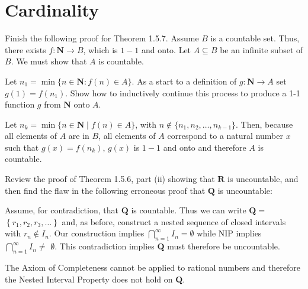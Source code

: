\section{Cardinality}

\begin{exercise}
  Finish the following proof for Theorem 1.5.7.
  Assume $B$ is a countable set. Thus, there exists $f: \mathbf{N} \rightarrow B$, which is $1-1$ and onto. Let $A \subseteq B$ be an infinite subset of $B$. We must show that $A$ is countable.

  Let $n_{1}=\min \{n \in \mathbf{N}: f(n) \in A\}$.
  As a start to a definition of $g: \mathbf{N} \rightarrow A$ set $g(1)=f\left(n_{1}\right)$.
  Show how to inductively continue this process to produce a 1-1 function $g$ from $\mathbf{N}$ onto $A$.
\end{exercise}

\begin{solution}
  \BAD
  Let $n_k=\min\{n\in\mathbf{N}\mid f(n)\in A\}$, with $n\notin\{n_1, n_2, \ldots, n_{k-1}\}$. Then, because all elements of $A$ are in $B$, all elements of $A$ correspond to a natural number $x$ such that $g(x)=f(n_k)$, $g(x)$ is $1-1$ and onto and therefore $A$ is countable.
\end{solution}

\begin{exercise}
  Review the proof of Theorem 1.5.6, part (ii) showing that $\mathbf{R}$ is uncountable, and then find the flaw in the following erroneous proof that $\mathbf{Q}$ is uncountable:

  Assume, for contradiction, that $\mathbf{Q}$ is countable. Thus we can write $\mathbf{Q}=$ $\left\{r_{1}, r_{2}, r_{3}, \ldots\right\}$ and, as before, construct a nested sequence of closed intervals with $r_{n} \notin I_{n}$. Our construction implies $\bigcap_{n=1}^{\infty} I_{n}=\emptyset$ while NIP implies $\bigcap_{n=1}^{\infty} I_{n} \neq$ $\emptyset$. This contradiction implies $\mathbf{Q}$ must therefore be uncountable.
\end{exercise}

\begin{solution}
  The Axiom of Completeness cannot be applied to rational numbers and therefore the Nested Interval Property does not hold on $\mathbf{Q}$.
\end{solution}

